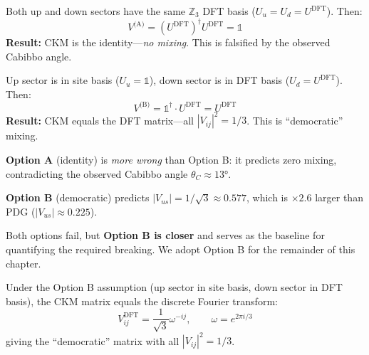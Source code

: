 \begin{description}[style=nextline, leftmargin=1em]
    \item[\textbf{Option A} (aligned sectors):]
        Both up and down sectors have the same $\mathbb{Z}_3$ DFT basis
        ($U_u = U_d = U^{\text{DFT}}$). Then:
        \begin{equation}
            V^{\text{(A)}} = (U^{\text{DFT}})^\dagger U^{\text{DFT}} = \mathbb{1}
            \label{eq:ch7_option_a}
        \end{equation}
        \textbf{Result:} CKM is the identity---\emph{no mixing}.
        This is falsified by the observed Cabibbo angle.

    \item[\textbf{Option B} (misaligned sectors):]
        Up sector is in site basis ($U_u = \mathbb{1}$), down sector is in
        DFT basis ($U_d = U^{\text{DFT}}$). Then:
        \begin{equation}
            V^{\text{(B)}} = \mathbb{1}^\dagger \cdot U^{\text{DFT}} = U^{\text{DFT}}
            \label{eq:ch7_option_b}
        \end{equation}
        \textbf{Result:} CKM equals the DFT matrix---all $|V_{ij}|^2 = 1/3$.
        This is ``democratic'' mixing.
\end{description}

\begin{tcolorbox}[colback=gray!5, colframe=gray!50!black,
    title=\textbf{Assessment of Options}]
\textbf{Option A} (identity) is \emph{more wrong} than Option B: it predicts
zero mixing, contradicting the observed Cabibbo angle $\theta_C \approx 13°$.

\textbf{Option B} (democratic) predicts $|V_{us}| = 1/\sqrt{3} \approx 0.577$,
which is $\times 2.6$ larger than PDG ($|V_{us}| \approx 0.225$).

Both options fail, but \textbf{Option B is closer} and serves as the baseline
for quantifying the required breaking. We adopt Option B for the remainder
of this chapter.
\end{tcolorbox}

\begin{postulate}
\label{post:ch7_z3_quarks}
Under the Option B assumption (up sector in site basis, down sector in DFT basis),
the CKM matrix equals the discrete Fourier transform:
\begin{equation}
    V_{ij}^{\text{DFT}} = \frac{1}{\sqrt{3}} \omega^{-ij},
    \qquad \omega = e^{2\pi i/3}
    \label{eq:ch7_dft_ckm}
\end{equation}
giving the ``democratic'' matrix with all $|V_{ij}|^2 = 1/3$.
\end{postulate}

